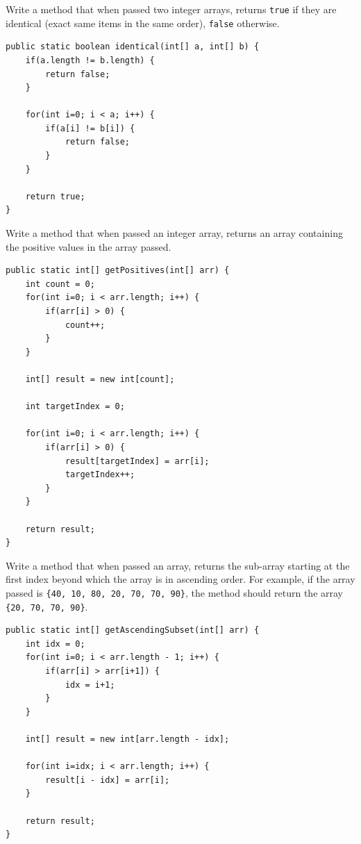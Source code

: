 \begin{questions}
\question Write a method that when passed two integer arrays, returns \texttt{true} if they are identical (exact same items in the same order), \texttt{false} otherwise.

\begin{solution}
\begin{lstlisting}
public static boolean identical(int[] a, int[] b) {
	if(a.length != b.length) {
		return false;
	}
		
	for(int i=0; i < a; i++) {
		if(a[i] != b[i]) {
			return false;
		}
	}
	
	return true;
}	
\end{lstlisting}	
\end{solution}

\question Write a method that when passed an integer array, returns an array containing the positive values in the array passed.

\begin{solution}
\begin{lstlisting}
public static int[] getPositives(int[] arr) {
	int count = 0;
	for(int i=0; i < arr.length; i++) {
		if(arr[i] > 0) {
			count++;
		}
	}
	
	int[] result = new int[count];
	
	int targetIndex = 0;
	
	for(int i=0; i < arr.length; i++) {
		if(arr[i] > 0) {
			result[targetIndex] = arr[i];
			targetIndex++;
		}
	}
	
	return result;
}
\end{lstlisting}	
\end{solution}

\question Write a method that when passed an array, returns the sub-array starting at the first index beyond which the array is in ascending order. For example, if the array passed is \texttt{\{40, 10, 80, 20, 70, 70, 90\}}, the method should return the array  \texttt{\{20, 70, 70, 90\}}.

\begin{solution}
\begin{lstlisting}
public static int[] getAscendingSubset(int[] arr) {
	int idx = 0;
	for(int i=0; i < arr.length - 1; i++) {
		if(arr[i] > arr[i+1]) {
			idx = i+1;
		}
	}
	
	int[] result = new int[arr.length - idx];
	
	for(int i=idx; i < arr.length; i++) {
		result[i - idx] = arr[i];
	}
	
	return result;
}
\end{lstlisting}	
\end{solution}

\end{questions}

